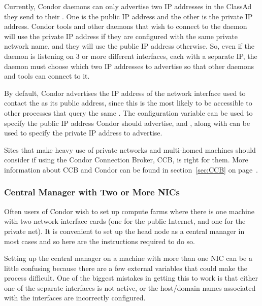 \begin{description}
  Currently, Condor daemons can only advertise two IP addresses in
  the ClassAd they send to their .  One is the
  public IP address and the other is the private IP address.
  Condor tools and other daemons that wish to connect to the daemon will
  use the private IP address if they are configured with the same private
  network name, and they will use the public IP address otherwise.
  So, even if the daemon is listening on 3 or more different interfaces,
  each with a separate IP, the daemon must choose which two IP addresses to
  advertise so that other daemons and tools can connect to it.

  By default, Condor advertises the IP address of the network interface
  used to contact the  as its public address,
  since this is the most likely to be
  accessible to other processes that query the same .
  The  configuration variable can be used 
  to specify the public IP address Condor should advertise, and
  , along with
   can be used to specify the
  private IP address to advertise.

\end{description}

Sites that make heavy use of private networks and multi-homed machines
should consider if using the Condor Connection Broker, CCB,
is right for them.
More information about CCB and Condor can be found in
section~\ref{sec:CCB} on page~\pageref{sec:CCB}.


\subsubsection{Central Manager with Two or More NICs}

Often users of Condor wish to set up compute farms where there is one
machine with two network interface cards (one for the public Internet,
and one for the private net). It is convenient to set up the head
node as a central manager in most cases and so here are the instructions
required to do so.

Setting up the central manager on a machine with more than one NIC can
be a little confusing because there are a few external variables
that could make the process difficult. One of the biggest mistakes
in getting this to work is that either one of the separate interfaces is
not active, or the host/domain names associated with the interfaces are
incorrectly configured. 

